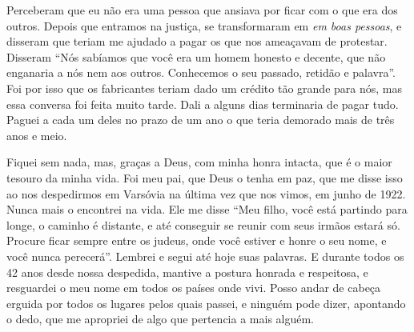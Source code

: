 Perceberam que eu não era uma pessoa que ansiava por ficar com o que era
dos outros. Depois que entramos na justiça, se transformaram em \textit{em
boas pessoas}, e disseram que teriam me ajudado a pagar os
que nos ameaçavam de protestar. Disseram ``Nós sabíamos que você era um
homem honesto e decente, que não enganaria a nós nem aos outros.
Conhecemos o seu passado, retidão e palavra''. Foi por isso que os fabricantes teriam dado um crédito tão grande para nós, mas essa
conversa foi feita muito tarde. Dali a alguns dias terminaria de pagar
tudo. Paguei a cada um deles no prazo de um ano o que teria demorado
mais de três anos e meio.

Fiquei sem nada, mas, graças a Deus, com minha honra intacta, que é
o maior tesouro da minha vida. Foi meu pai, que Deus o tenha em
paz, que me disse isso ao nos despedirmos em Varsóvia na última
vez que nos vimos, em junho de 1922. Nunca mais o encontrei na vida. Ele me disse 
``Meu filho, você está partindo para longe, o caminho é distante, e até
conseguir se reunir com seus irmãos estará só. Procure ficar sempre
entre os judeus, onde você estiver e honre o seu nome, e você nunca
perecerá''. Lembrei e segui até hoje suas palavras. E durante todos os 42 anos desde nossa despedida, mantive a
postura honrada e respeitosa, e resguardei o meu nome em todos os países
onde vivi. Posso andar de cabeça erguida por todos os lugares pelos quais 
passei, e ninguém pode dizer, apontando o dedo, que me apropriei de
algo que pertencia a mais alguém.
